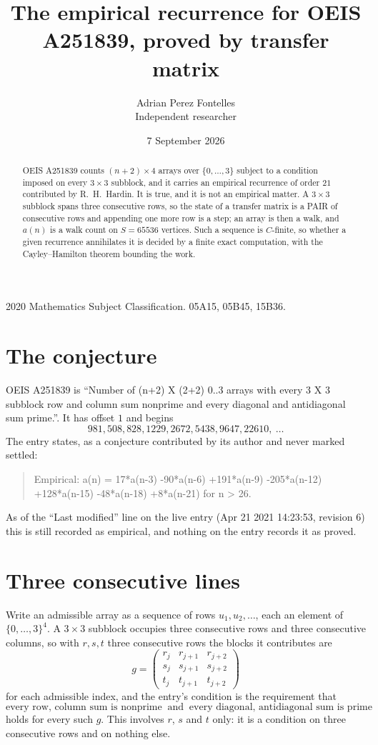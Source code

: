 \documentclass[11pt,a4paper]{article}
\title{The empirical recurrence for OEIS A251839, proved by transfer matrix}
\author{Adrian Perez Fontelles\\ \small Independent researcher}
\date{7 September 2026}
\theoremstyle{plain}
\theoremstyle{definition}
\begin{document}
\maketitle

\begin{abstract}
OEIS A251839 counts $(n+2)\times4$ arrays over $\{0,\dots,3\}$ subject to a condition imposed on
every $3\times3$ subblock, and it carries an empirical recurrence of order $21$
contributed by R.~H.~Hardin. It is true, and it is not an empirical matter. A $3\times3$
subblock spans three consecutive rows, so the state of a transfer matrix is a PAIR of
consecutive rows and appending one more row is a step; an array is then a walk, and
$a(n)$ is a walk count on $S=65536$ vertices. Such a sequence is $C$-finite, so whether a given
recurrence annihilates it is decided by a finite exact computation, with the Cayley--Hamilton
theorem bounding the work.
\end{abstract}

\noindent\small 2020 Mathematics Subject Classification. 05A15, 05B45, 15B36.\normalsize

\section{The conjecture}

OEIS A251839 is ``Number of (n+2) X (2+2) 0..3 arrays with every 3 X 3 subblock row and column sum nonprime and every diagonal and antidiagonal sum prime.''. It has offset $1$ and begins
\[
981, 508, 828, 1229, 2672, 5438, 9647, 22610,\ \dots
\]
The entry states, as a conjecture contributed by its author and never marked settled:
\begin{quote}
Empirical: a(n) = 17*a(n-3) -90*a(n-6) +191*a(n-9) -205*a(n-12) +128*a(n-15) -48*a(n-18) +8*a(n-21) for n > 26.
\end{quote}
As of the ``Last modified'' line on the live entry (Apr 21 2021 14:23:53, revision 6) this is still
recorded as empirical, and nothing on the entry records it as proved.

\section{Three consecutive lines}

Write an admissible array as a sequence of rows $u_1,u_2,\dots$, each an element of
$\{0,\dots,3\}^{4}$. A $3\times3$ subblock occupies three consecutive rows and
three consecutive columns, so with $r,s,t$ three consecutive rows the blocks it
contributes are
\[
g=\begin{pmatrix}r_j&r_{j+1}&r_{j+2}\\ s_j&s_{j+1}&s_{j+2}\\ t_j&t_{j+1}&t_{j+2}\end{pmatrix}
\]
for each admissible index, and the entry's condition is the requirement that
\[
\text{every row, column sum is nonprime}\ \text{ and }\ \text{every diagonal, antidiagonal sum is prime}
\]
holds for every such $g$. This involves $r$, $s$ and $t$ only: it is a condition on
three consecutive rows and on nothing else.
\end{document}

